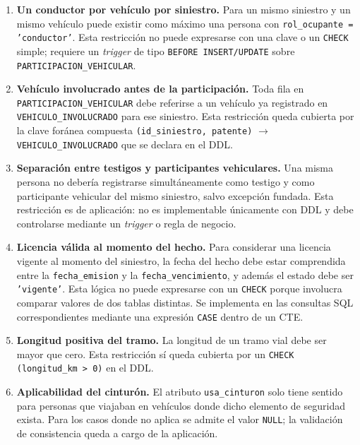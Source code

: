 \documentclass[12pt,a4paper]{article}
\begin{document}
\begin{enumerate}[leftmargin=*]
    \item \textbf{Un conductor por vehículo por siniestro.} Para un mismo siniestro y un mismo vehículo puede existir como máximo una persona con \texttt{rol\_ocupante = 'conductor'}. Esta restricción no puede expresarse con una clave o un \texttt{CHECK} simple; requiere un \textit{trigger} de tipo \texttt{BEFORE INSERT/UPDATE} sobre \texttt{PARTICIPACION\_VEHICULAR}.

    \item \textbf{Vehículo involucrado antes de la participación.} Toda fila en \texttt{PARTICIPACION\_VEHICULAR} debe referirse a un vehículo ya registrado en \texttt{VEHICULO\_INVOLUCRADO} para ese siniestro. Esta restricción queda cubierta por la clave foránea compuesta \texttt{(id\_siniestro, patente)} $\rightarrow$ \texttt{VEHICULO\_INVOLUCRADO} que se declara en el DDL.

    \item \textbf{Separación entre testigos y participantes vehiculares.} Una misma persona no debería registrarse simultáneamente como testigo y como participante vehicular del mismo siniestro, salvo excepción fundada. Esta restricción es de aplicación: no es implementable únicamente con DDL y debe controlarse mediante un \textit{trigger} o regla de negocio.

    \item \textbf{Licencia válida al momento del hecho.} Para considerar una licencia vigente al momento del siniestro, la fecha del hecho debe estar comprendida entre la \texttt{fecha\_emision} y la \texttt{fecha\_vencimiento}, y además el estado debe ser \texttt{'vigente'}. Esta lógica no puede expresarse con un \texttt{CHECK} porque involucra comparar valores de dos tablas distintas. Se implementa en las consultas SQL correspondientes mediante una expresión \texttt{CASE} dentro de un CTE.

    \item \textbf{Longitud positiva del tramo.} La longitud de un tramo vial debe ser mayor que cero. Esta restricción sí queda cubierta por un \texttt{CHECK (longitud\_km > 0)} en el DDL.

    \item \textbf{Aplicabilidad del cinturón.} El atributo \texttt{usa\_cinturon} solo tiene sentido para personas que viajaban en vehículos donde dicho elemento de seguridad exista. Para los casos donde no aplica se admite el valor \texttt{NULL}; la validación de consistencia queda a cargo de la aplicación.
\end{enumerate}
\end{document}
